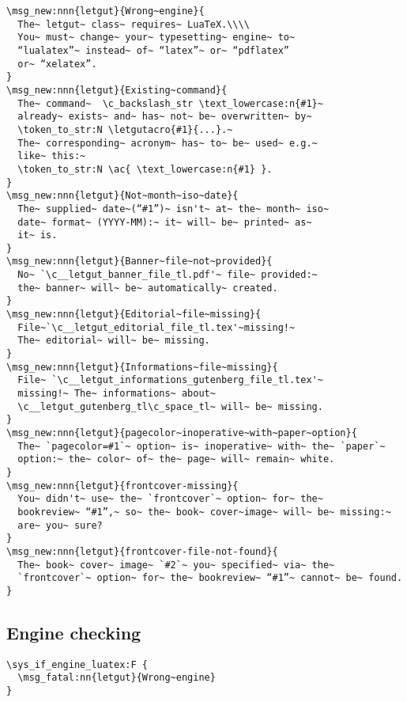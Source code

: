 \documentclass{letgut}
\begin{document}
\begin{lstlisting}
\msg_new:nnn{letgut}{Wrong~engine}{
  The~ letgut~ class~ requires~ LuaTeX.\\\\
  You~ must~ change~ your~ typesetting~ engine~ to~
  “lualatex”~ instead~ of~ “latex”~ or~ “pdflatex”
  or~ “xelatex”.
}
\msg_new:nnn{letgut}{Existing~command}{
  The~ command~  \c_backslash_str \text_lowercase:n{#1}~
  already~ exists~ and~ has~ not~ be~ overwritten~ by~
  \token_to_str:N \letgutacro{#1}{...}.~
  The~ corresponding~ acronym~ has~ to~ be~ used~ e.g.~
  like~ this:~
  \token_to_str:N \ac{ \text_lowercase:n{#1} }.
}
\msg_new:nnn{letgut}{Not~month~iso~date}{
  The~ supplied~ date~(“#1”)~ isn't~ at~ the~ month~ iso~
  date~ format~ (YYYY-MM):~ it~ will~ be~ printed~ as~
  it~ is.
}
\msg_new:nnn{letgut}{Banner~file~not~provided}{
  No~ `\c__letgut_banner_file_tl.pdf'~ file~ provided:~
  the~ banner~ will~ be~ automatically~ created.
}
\msg_new:nnn{letgut}{Editorial~file~missing}{
  File~`\c__letgut_editorial_file_tl.tex'~missing!~
  The~ editorial~ will~ be~ missing.
}
\msg_new:nnn{letgut}{Informations~file~missing}{
  File~ `\c__letgut_informations_gutenberg_file_tl.tex'~
  missing!~ The~ informations~ about~
  \c__letgut_gutenberg_tl\c_space_tl~ will~ be~ missing.
}
\msg_new:nnn{letgut}{pagecolor~inoperative~with~paper~option}{
  The~ `pagecolor=#1`~ option~ is~ inoperative~ with~ the~ `paper`~
  option:~ the~ color~ of~ the~ page~ will~ remain~ white.
}
\msg_new:nnn{letgut}{frontcover-missing}{
  You~ didn't~ use~ the~ `frontcover`~ option~ for~ the~
  bookreview~ “#1”,~ so~ the~ book~ cover~image~ will~ be~ missing:~
  are~ you~ sure?
}
\msg_new:nnn{letgut}{frontcover-file-not-found}{
  The~ book~ cover~ image~ `#2`~ you~ specified~ via~ the~
  `frontcover`~ option~ for~ the~ bookreview~ “#1”~ cannot~ be~ found.
}
\end{lstlisting}

\subsection{Engine checking}
\label{ImplementationEnginechecking-lz7g55h0jlj0}
\begin{lstlisting}
\sys_if_engine_luatex:F {
  \msg_fatal:nn{letgut}{Wrong~engine}
}
\end{lstlisting}
\end{document}
